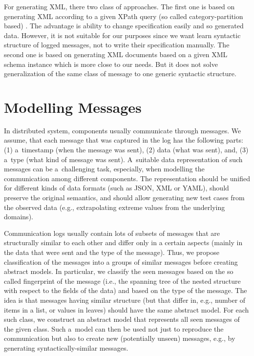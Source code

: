 {For generating XML, there two class of approaches.
The first one is based on generating XML according to a given XPath query
(so called category-partition based) \cite{xpath1, xpath2}.
The advantage is ability to change specification easily and so generated data.
However, it is not suitable for our purposes since we want learn syntactic structure
of logged messages, not to write their specification manually.
The second one is based on generating XML documents based on a given XML schema \cite{xmlscheme} instance
which is more close to our needs.
But it does not solve generalization of the same class of message to one generic syntactic structure. 

\section{Modelling Messages} \label{sec:messages} 

In distributed system, components usually communicate through messages.
%
We assume, that each message that was captured in the log has the following
parts: (1) a~timestamp (when the message was sent), (2) data (what was sent),
and, (3) a~type (what kind of message was sent).
%
A~suitable data representation of such messages can be a~challenging task,
especially, when modelling the communication among different components.  
%
The representation should be unified for different kinds of data formats (such
as JSON, XML or YAML), should preserve the original semantics, and should allow
generating new test cases from the observed data (e.g., extrapolating extreme
values from the underlying domains).  

Communication logs usually contain lots of subsets of messages that are
structurally similar to each other and differ only in a certain aspects (mainly
in the data that were sent and the type of the message). Thus, we propose
classification of the messages into a groups of similar messages before creating
abstract models.
%
In particular, we classify the seen messages based on the so called fingerprint
of the message (i.e., the spanning tree of the nested structure with respect to
the fields of the data) and based on the type of the message.
%
The idea is that messages having similar structure (but that differ in, e.g.,
number of items in a list, or values in leaves) should have the same abstract
model.
%
For each such class, we construct an abstract model that represents all seen
messages of the given class.
%
Such a~model can then be used not just to reproduce the communication but also
to create new (potentially unseen) messages, e.g., by generating
syntactically-similar messages. 

}
